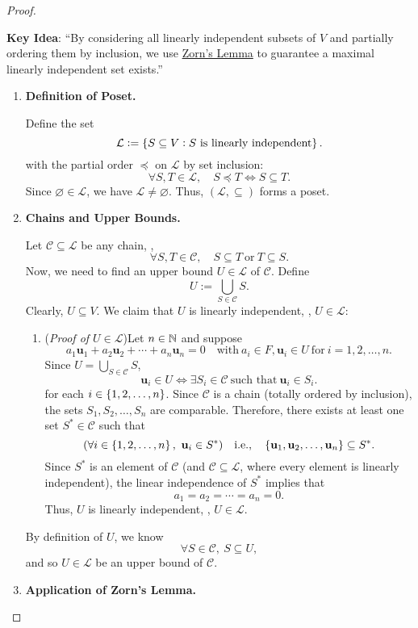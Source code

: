\documentclass[11pt,openany]{article}
\renewcommand{\vec}[1]{\mathbf{#1}}
\begin{document}
\newpage
{}
\begin{proof}
\ \begin{flushleft}\color{red}
\textbf{Key Idea}: ``By considering all linearly independent subsets of \(V\) and partially ordering them by inclusion, we use \underline{Zorn's Lemma} to guarantee a maximal linearly independent set exists.''
\end{flushleft}
\begin{enumerate}[Step 1]
	\item \textbf{Definition of Poset.}
	
	Define the set \[
	\mathcal{L}:=\set{S\subseteq V:\text{$S$ is linearly independent}}.
	\] with the partial order $\preceq$ on $\mathcal{L}$ by set inclusion: \[
	\forall S,T\in\mathcal{L},\quad S\preceq T\iff S\subseteq T.
	\] Since $\varnothing\in\mathcal{L}$, we have $\mathcal{L}\neq\varnothing$. Thus, $(\mathcal{L},\subseteq)$ forms a poset.
	\item \textbf{Chains and Upper Bounds.}
	
	Let $\mathcal{C}\subseteq\mathcal{L}$ be any chain, \ie, \[
	\forall S,T\in\mathcal{C},\quad S\subseteq T\ \text{or}\ T\subseteq S.
	\] Now, we need to find an upper bound $U\in\mathcal{L}$ of $\mathcal{C}$. Define \[
	U:=\bigcup_{S\in\mathcal{C}}S.
	\] Clearly, $U\subseteq V$. We claim that $U$ is linearly independent, \ie, $U\in\mathcal{L}$:
	\begin{enumerate}
		\item[] (\textit{Proof of $U\in\mathcal{L}$})\quad Let $n\in\mathbb{N}$ and suppose \[
		a_1\vec{u}_1+a_2\vec{u}_2+\cdots+a_n\vec{u}_n=0\quad\text{with}\ a_i\in F, \vec{u}_i\in U\ \text{for}\ i=1,2,\dots,n.
		\] Since $U=\bigcup_{S\in\mathcal{C}}S$, \[
		\vec{u}_i\in U\iff \exists S_i\in\mathcal{C}\ \text{such that}\ \vec{u}_i\in S_i.
		\] for each $i\in\set{1,2,\dots,n}$. Since $\mathcal{C}$ is a chain (totally ordered by inclusion), the sets $S_1,S_2,\dots,S_n$ are comparable. Therefore, there exists at least one set $S^*\in\mathcal{C}$ such that \[
		(\forall i\in\set{1,2,\dots,n},\ \vec{u}_i\in S^*)\quad\ie,\quad\set{\vec{u}_1,\vec{u}_2,\dots,\vec{u}_n}\subseteq S^*.
		\] Since $S^*$ is an element of $\mathcal{C}$ (and $\mathcal{C}\subseteq\mathcal{L}$, where every element is linearly independent), the linear independence of $S^*$ implies that \[
		a_1=a_2=\cdots=a_n=0.
		\] Thus, $U$ is linearly independent, \ie, $U\in\mathcal{L}$.
	\end{enumerate}
	 By definition of $U$, we know \[
	 \forall S\in\mathcal{C},\ S\subseteq U,
	 \] and so $U\in\mathcal{L}$ be an upper bound of $\mathcal{C}$.
	\item \textbf{Application of Zorn's Lemma.}
	

\end{enumerate}
\end{proof}
\end{document}

